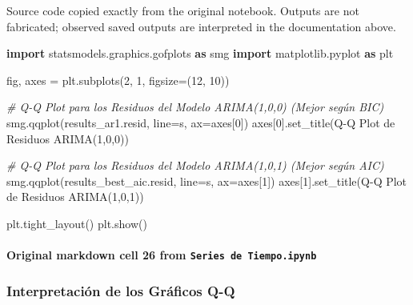 \documentclass[
  11pt,
]{article}
\newenvironment{Shaded}{}{}
\newcommand{\CommentTok}[1]{\textcolor[rgb]{0.38,0.63,0.69}{\textit{#1}}}
\newcommand{\DecValTok}[1]{\textcolor[rgb]{0.25,0.63,0.44}{#1}}
\newcommand{\ImportTok}[1]{\textcolor[rgb]{0.00,0.50,0.00}{\textbf{#1}}}
\newcommand{\NormalTok}[1]{#1}
\newcommand{\OperatorTok}[1]{\textcolor[rgb]{0.40,0.40,0.40}{#1}}
\newcommand{\StringTok}[1]{\textcolor[rgb]{0.25,0.44,0.63}{#1}}
\begin{document}
Source code copied exactly from the original notebook. Outputs are not fabricated; observed saved outputs are interpreted in the documentation above.

\begin{Shaded}
\begin{Highlighting}[]
\ImportTok{import}\NormalTok{ statsmodels.graphics.gofplots }\ImportTok{as}\NormalTok{ smg}
\ImportTok{import}\NormalTok{ matplotlib.pyplot }\ImportTok{as}\NormalTok{ plt}

\NormalTok{fig, axes }\OperatorTok{=}\NormalTok{ plt.subplots(}\DecValTok{2}\NormalTok{, }\DecValTok{1}\NormalTok{, figsize}\OperatorTok{=}\NormalTok{(}\DecValTok{12}\NormalTok{, }\DecValTok{10}\NormalTok{))}

\CommentTok{\# Q{-}Q Plot para los Residuos del Modelo ARIMA(1,0,0) (Mejor según BIC)}
\NormalTok{smg.qqplot(results\_ar1.resid, line}\OperatorTok{=}\StringTok{\textquotesingle{}s\textquotesingle{}}\NormalTok{, ax}\OperatorTok{=}\NormalTok{axes[}\DecValTok{0}\NormalTok{])}
\NormalTok{axes[}\DecValTok{0}\NormalTok{].set\_title(}\StringTok{\textquotesingle{}Q{-}Q Plot de Residuos ARIMA(1,0,0)\textquotesingle{}}\NormalTok{)}

\CommentTok{\# Q{-}Q Plot para los Residuos del Modelo ARIMA(1,0,1) (Mejor según AIC)}
\NormalTok{smg.qqplot(results\_best\_aic.resid, line}\OperatorTok{=}\StringTok{\textquotesingle{}s\textquotesingle{}}\NormalTok{, ax}\OperatorTok{=}\NormalTok{axes[}\DecValTok{1}\NormalTok{])}
\NormalTok{axes[}\DecValTok{1}\NormalTok{].set\_title(}\StringTok{\textquotesingle{}Q{-}Q Plot de Residuos ARIMA(1,0,1)\textquotesingle{}}\NormalTok{)}

\NormalTok{plt.tight\_layout()}
\NormalTok{plt.show()}
\end{Highlighting}
\end{Shaded}

\paragraph{\texorpdfstring{Original markdown cell 26 from \texttt{Series\ de\ Tiempo.ipynb}}{Original markdown cell 26 from Series de Tiempo.ipynb}}\label{original-markdown-cell-26-from-series-de-tiempoipynb}

\subsubsection{Interpretación de los Gráficos Q-Q}\label{interpretaciuxf3n-de-los-gruxe1ficos-q-q}
\end{document}
